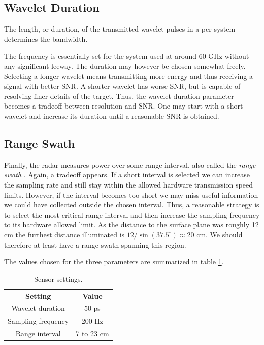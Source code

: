 \subsection{Wavelet Duration}

The length, or duration, of the transmitted wavelet pulses in a \gls{pcr} system determines the bandwidth. 

The frequency is essentially set for the system used at around 60 GHz without any significant leeway. The duration may however be chosen somewhat freely. Selecting a longer wavelet means transmitting more energy and thus receiving a signal with better SNR. A shorter wavelet has worse SNR, but is capable of resolving finer details of the target. Thus, the wavelet duration parameter becomes a tradeoff between resolution and SNR. One may start with a short wavelet and increase its duration until a reasonable SNR is obtained.  

\subsection{Range Swath}

Finally, the radar measures power over some range interval, also called the \emph{range swath} \citep{richards_2014}. Again, a tradeoff appears. If a short interval is selected we can increase the sampling rate and still stay within the allowed hardware transmission speed limits. However, if the interval becomes too short we may miss useful information we could have collected outside the chosen interval. Thus, a reasonable strategy is to select the most critical range interval and then increase the sampling frequency to its hardware allowed limit. As the distance to the surface plane was roughly 12 cm the furthest distance illuminated is $12/\sin(37.5^\circ)\approx 20$ cm. We should therefore at least have a range swath spanning this region. 

The values chosen for the three parameters are summarized in table \ref{tab:sensor_settings}.

\begin{table}
\begin{center}
	\begin{tabular}{|c|c|}
	  	\hline
	  	\cellcolor{gray!150}\color{white}\textbf{Setting} & \cellcolor{gray!150}\color{white}\textbf{Value} \\
	 	 Wavelet duration & 50 ps \\
	  	\cellcolor{gray!25}Sampling frequency & \cellcolor{gray!25}200 Hz \\
	  	Range interval & 7 to 23 cm \\ 
		\hline
  	\end{tabular}	
\end{center}
\caption{Sensor settings.}
\label{tab:sensor_settings}
\end{table}

